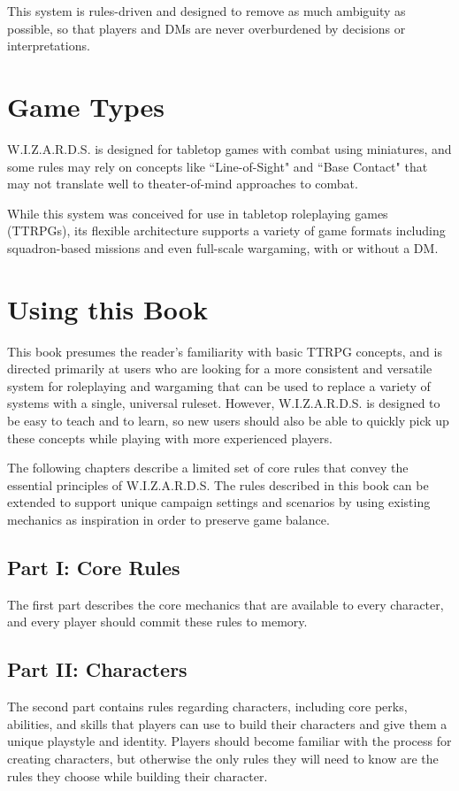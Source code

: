 This system is rules-driven and designed to remove as much 
ambiguity as possible,
so that players and DMs are never overburdened by 
decisions or interpretations.



\section{Game Types}
W.I.Z.A.R.D.S. is designed for tabletop games with combat using miniatures, 
and some rules may rely on concepts like ``Line-of-Sight" and ``Base Contact" 
that may not translate well to theater-of-mind approaches to combat.

\vspace{0.4em}

While this system was conceived for use in tabletop roleplaying games (TTRPGs),
its flexible architecture supports a variety of game formats including 
squadron-based missions and even full-scale wargaming,
with or without a DM.



\section{Using this Book}
This book presumes the reader's familiarity with basic TTRPG concepts,
and is directed primarily at users who are looking for a more consistent 
and versatile system for roleplaying and wargaming that can be used
to replace a variety of systems with a single, universal ruleset.
However, W.I.Z.A.R.D.S. is designed to be easy to teach and to learn,
so new users should also be able to quickly pick up these concepts 
while playing with more experienced players.

\vspace{0.4em}

The following chapters describe a limited set of core rules that convey
the essential principles of W.I.Z.A.R.D.S. 
The rules described in this book can be extended to support 
unique campaign settings and scenarios
by using existing mechanics as inspiration
in order to preserve game balance.

\subsection{Part I: Core Rules}
The first part describes the core mechanics that are available to 
every character, and every player should commit these rules to memory.

\subsection{Part II: Characters}
The second part contains rules regarding characters, 
including core perks, abilities, and skills that players can use to 
build their characters and give them a unique playstyle and identity.
Players should become familiar with the process for creating characters,
but otherwise the only rules they will need to know are the rules they choose
while building their character.

